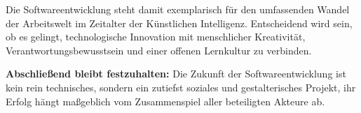 Die Softwareentwicklung steht damit exemplarisch für den umfassenden Wandel der
Arbeitswelt im Zeitalter der Künstlichen Intelligenz. Entscheidend wird sein,
ob es gelingt, technologische Innovation mit menschlicher Kreativität,
Verantwortungsbewusstsein und einer offenen Lernkultur zu verbinden.

\textbf{Abschließend bleibt festzuhalten:} Die Zukunft der Softwareentwicklung ist kein rein technisches, sondern ein zutiefst soziales und gestalterisches Projekt, ihr Erfolg hängt maßgeblich vom Zusammenspiel aller beteiligten Akteure ab.

% 

% 

% 